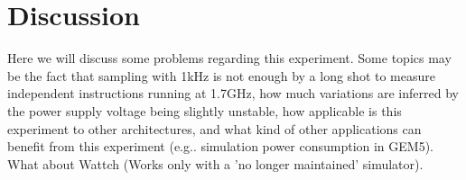 
\section{Discussion}
Here we will discuss some problems regarding this experiment. Some topics may be
the fact that sampling with 1kHz is not enough by a long shot to measure
independent instructions running at 1.7GHz, how much variations are inferred by
the power supply voltage being slightly unstable, how applicable is this
experiment to other architectures, and what kind of other applications can
benefit from this experiment (e.g.. simulation power consumption in GEM5). What
about Wattch (Works only with a 'no longer maintained' simulator).



